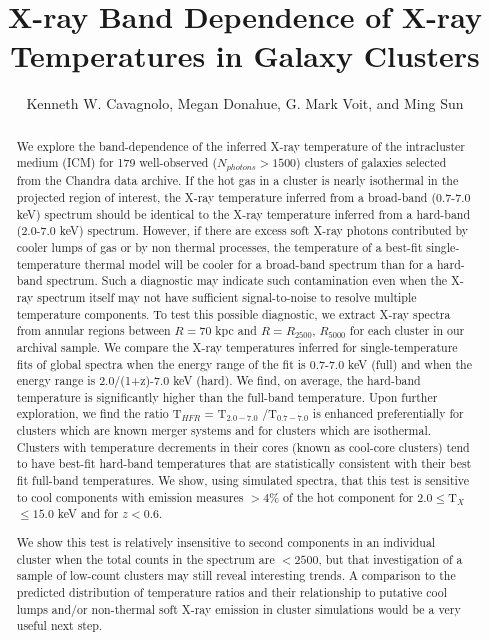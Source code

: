 \documentclass{emulateapj}
\newcommand{\tf}{T$_{HFR}$ }
\newcommand{\hard}{T$_{2.0-7.0}$ }
\newcommand{\full}{T$_{0.7-7.0}$ }
\newcommand{\tx}{T$_{X}$}
\begin{document}
\title{X-ray Band Dependence of X-ray \\
	Temperatures in Galaxy Clusters}
\author{Kenneth W. Cavagnolo, Megan
Donahue, G. Mark Voit, and Ming
Sun}


\begin{abstract}

We explore the band-dependence of the inferred X-ray temperature of
the intracluster medium (ICM) for 179 well-observed ($N_{photons} >
1500$) clusters of galaxies selected from the Chandra data archive. If
the hot gas in a cluster is nearly isothermal in the projected region
of interest, the  X-ray temperature inferred from a broad-band
(0.7-7.0 keV) spectrum should be identical to the X-ray temperature
inferred from a hard-band (2.0-7.0 keV) spectrum. However,  if there are
excess soft X-ray photons contributed by cooler lumps of gas or by
non thermal processes, the temperature of a best-fit 
single-temperature thermal model will be cooler for a broad-band
spectrum than for a hard-band spectrum. Such a diagnostic may
indicate such contamination even when the X-ray spectrum itself may
not have sufficient signal-to-noise to resolve multiple temperature
components. To test this possible diagnostic, we extract X-ray spectra
from annular regions between $R=70$ kpc and $R=R_{2500}$, $R_{5000}$ for
each cluster in our archival sample. We compare the X-ray temperatures
inferred for single-temperature fits of global spectra when the energy
range of the fit is 0.7-7.0 keV (full) and when the energy range is
2.0/(1+z)-7.0 keV (hard). We find, on average, the hard-band
temperature is significantly higher than the full-band 
temperature. Upon further exploration, we find the ratio
\tf = \hard/\full is enhanced preferentially for clusters which are
known merger systems and for clusters which are isothermal. Clusters
with temperature decrements in their cores (known as cool-core
clusters) tend to have best-fit hard-band temperatures that are
statistically consistent with their best fit full-band
temperatures. We show, using simulated spectra, that this test is
sensitive to cool components with emission measures $> 4\%$ of the
hot component for $2.0 \leq $\tx$ \leq 15.0$ keV and for $z < 0.6$.

We show this test is relatively insensitive to second components
in an individual cluster when the total counts in the spectrum are $<
2500$, but that investigation of a sample of low-count clusters may
still reveal interesting trends. A comparison to the predicted
distribution of temperature ratios and their relationship to putative
cool lumps and/or non-thermal soft X-ray emission in cluster simulations would be a very useful next step.
\end{abstract}
\end{document}
